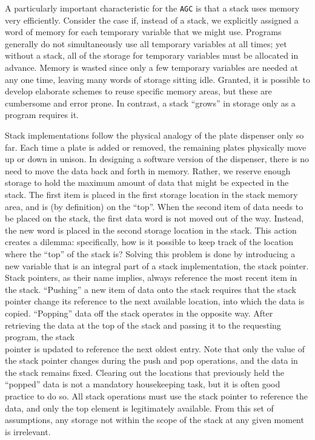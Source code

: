 \documentclass[refcap, oxford]{ahsan}
\begin{document}
A particularly important characteristic for the \texttt{AGC} is that a stack uses memory very efficiently. Consider the case if, instead of a stack, we explicitly assigned a word of memory for each temporary variable that we might use. Programs generally do not simultaneously use all temporary variables at all times; yet without a stack, all of the storage for temporary variables must be allocated in advance. Memory is wasted since only a few temporary variables are needed at any one time, leaving many words of storage sitting idle. Granted, it is possible to develop elaborate schemes to reuse specific memory areas, but these are cumbersome and error prone. In contrast, a stack ``grows'' in storage only as a program requires it.

Stack implementations follow the physical analogy of the plate dispenser only so far. Each time a plate is added or removed, the remaining plates physically move up or down in unison. In designing a software version of the dispenser, there is no need to move the data back and forth in memory. Rather, we reserve enough storage to hold the maximum amount of data that might be expected in the stack. The first item is placed in the first storage location in the stack memory area, and is (by definition) on the ``top''. When the second item of data needs to be placed on the stack, the first data word is not moved out of the way. Instead, the new word is placed in the second storage location in the stack. This action creates a dilemma: specifically, how is it possible to keep track of the location where the ``top'' of the stack is? Solving this problem is done by introducing a new variable that is an integral part of a stack implementation, the stack pointer. Stack pointers, as their name implies, always reference the most recent item in the stack. ``Pushing'' a new item of data onto the stack requires that the stack pointer change its reference to the next available location, into which the data is copied. ``Popping'' data off the stack operates in the opposite way. After retrieving the data at the top of the stack and passing it to the requesting program, the stack\\
pointer is updated to reference the next oldest entry. Note that only the value of the stack pointer changes during the push and pop operations, and the data in the stack remains fixed. Clearing out the locations that previously held the ``popped'' data is not a mandatory housekeeping task, but it is often good practice to do so. All stack operations must use the stack pointer to reference the data, and only the top element is legitimately available. From this set of assumptions, any storage not within the scope of the stack at any given moment is irrelevant.
\end{document}
